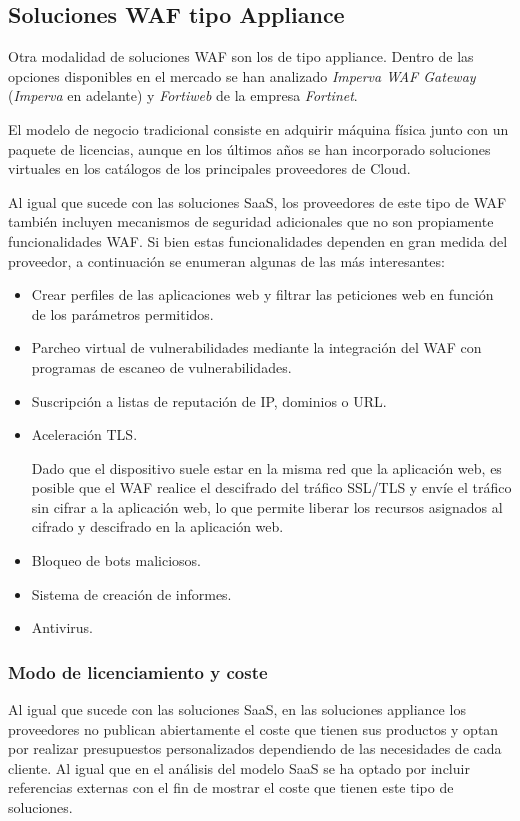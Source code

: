 \subsection{Soluciones WAF tipo Appliance}
\par Otra modalidad de soluciones WAF son los de tipo appliance. Dentro de las opciones disponibles en el mercado se han analizado {\em Imperva
WAF Gateway\cite{imperva}} ({\em Imperva} en adelante) y {\em Fortiweb\cite{fortiweb}} de la empresa {\em Fortinet\cite{fortinet}}.
\par El modelo de negocio tradicional consiste en adquirir máquina física junto con un paquete de licencias, aunque en los últimos años se han
incorporado soluciones virtuales en los catálogos de los principales proveedores de Cloud.
\par Al igual que sucede con las soluciones SaaS, los proveedores de este tipo de WAF también incluyen mecanismos de seguridad adicionales que
no son propiamente funcionalidades WAF. Si bien estas funcionalidades dependen en gran medida del proveedor, a continuación se enumeran algunas
de las más interesantes:
\begin{itemize}
  \item Crear perfiles de las aplicaciones web y filtrar las peticiones web en función de los parámetros permitidos.
  \item Parcheo virtual de vulnerabilidades mediante la integración del WAF con programas de escaneo de vulnerabilidades.
  \item Suscripción a listas de reputación de IP, dominios o URL.
  \item Aceleración TLS.
    \par Dado que el dispositivo suele estar en la misma red que la aplicación web, es posible que el WAF realice el descifrado del tráfico
    SSL/TLS y envíe el tráfico sin cifrar a la aplicación web, lo que permite liberar los recursos asignados al cifrado y descifrado en la
    aplicación web.
  \item Bloqueo de bots maliciosos.
  \item Sistema de creación de informes.
  \item Antivirus.
\end{itemize}

\subsubsection{Modo de licenciamiento y coste}
\par Al igual que sucede con las soluciones SaaS, en las soluciones appliance los proveedores no publican abiertamente el coste que tienen sus
productos y optan por realizar presupuestos personalizados dependiendo de las necesidades de cada cliente. Al igual que en el análisis del
modelo SaaS se ha optado por incluir referencias externas con el fin de mostrar el coste que tienen este tipo de soluciones.

